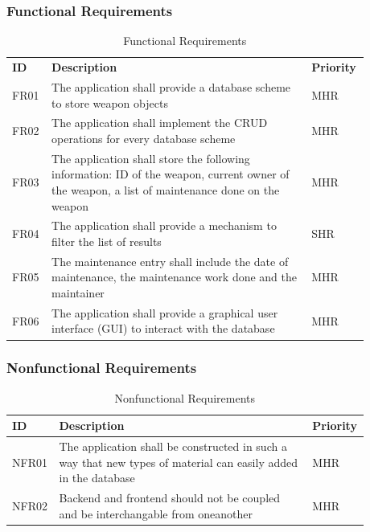 \subsubsection{Functional Requirements}
\begin{table}[!ht]
    \centering
    \begin{tabular}{ | b{0.09\linewidth} | b{0.7\linewidth} | b{0.09\linewidth} | }
        \hline
        \textbf{ID} & \textbf{Description} & \textbf{Priority} \\
        FR01        & The application shall provide a database scheme to store weapon objects                   & MHR \\ \hline
        FR02        & The application shall implement the CRUD operations for every database scheme             & MHR \\ \hline
        FR03        & The application shall store the following information: ID of the weapon, current owner of the
                      weapon, a list of maintenance done on the weapon                                          & MHR \\ \hline
        FR04        & The application shall provide a mechanism to filter the list of results                   & SHR \\ \hline
        FR05        & The maintenance entry shall include the date of maintenance, the maintenance work done
                      and the maintainer                                                                        & MHR \\ \hline
        FR06        & The application shall provide a graphical user interface (GUI) to interact with
                      the database                                                                              & MHR \\ \hline 
    \end{tabular}
    \caption{Functional Requirements}
    \label{tab:functional_requirements}
\end{table}

\subsubsection{Nonfunctional Requirements}
\begin{table}[!ht]
    \centering
    \begin{tabular}{ | b{0.09\linewidth} | b{0.7\linewidth} | b{0.09\linewidth} | }
        \hline
        \textbf{ID} & \textbf{Description} & \textbf{Priority} \\
        \hline
        NFR01       & The application shall be constructed in such a way that new types of material can
                      easily added in the database                                                          & MHR \\ \hline
        NFR02       & Backend and frontend should not be coupled and be interchangable from oneanother      & MHR \\ \hline
    \end{tabular}
    \caption{Nonfunctional Requirements}
    \label{tab:nonfunctional_requirements}
\end{table}


